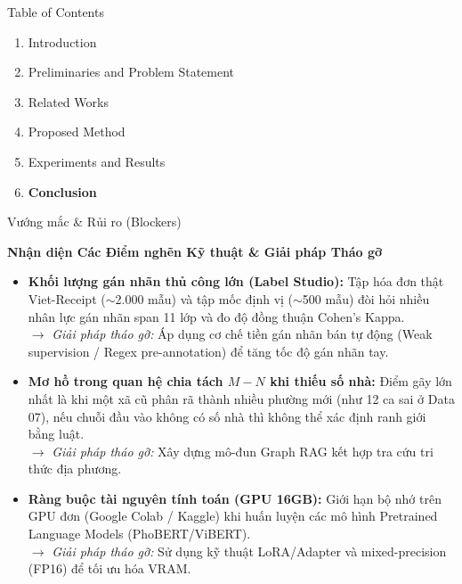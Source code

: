 \documentclass[aspectratio=169,9pt]{beamer}
\begin{document}
\begin{frame}{Table of Contents}
  \vspace{0.4cm}
  \begin{enumerate}[\bfseries 1]
    \setlength{\itemsep}{0.35cm}
    \item \color{gray} Introduction
    \item \color{gray} Preliminaries and Problem Statement
    \item \color{gray} Related Works
    \item \color{gray} Proposed Method
    \item \color{gray} Experiments and Results
    \item \textbf{\color{bkblue} Conclusion}
  \end{enumerate}
\end{frame}

\begin{frame}{Vướng mắc \& Rủi ro (Blockers)}
  \vspace{-0.1cm}
  \centerline{\large\textbf{Nhận diện Các Điểm nghẽn Kỹ thuật \& Giải pháp Tháo gỡ}}
  \vspace{0.08cm}

  {\small
  \begin{itemize}
    \setlength{\itemsep}{1.8pt}
    \item \textbf{Khối lượng gán nhãn thủ công lớn (Label Studio):} Tập hóa đơn thật Viet-Receipt ($\sim$2.000 mẫu) và tập mốc định vị ($\sim$500 mẫu) đòi hỏi nhiều nhân lực gán nhãn span 11 lớp và đo độ đồng thuận Cohen's Kappa.\\
      $\to$ \textit{Giải pháp tháo gỡ:} Áp dụng cơ chế tiền gán nhãn bán tự động (Weak supervision / Regex pre-annotation) để tăng tốc độ gán nhãn tay.
    \item \textbf{Mơ hồ trong quan hệ chia tách $M - N$ khi thiếu số nhà:} Điểm gãy lớn nhất là khi một xã cũ phân rã thành nhiều phường mới (như 12 ca sai ở Data 07), nếu chuỗi đầu vào không có số nhà thì không thể xác định ranh giới bằng luật.\\
      $\to$ \textit{Giải pháp tháo gỡ:} Xây dựng mô-đun Graph RAG kết hợp tra cứu tri thức địa phương.
    \item \textbf{Ràng buộc tài nguyên tính toán (GPU 16GB):} Giới hạn bộ nhớ trên GPU đơn (Google Colab / Kaggle) khi huấn luyện các mô hình Pretrained Language Models (PhoBERT/ViBERT).\\
      $\to$ \textit{Giải pháp tháo gỡ:} Sử dụng kỹ thuật LoRA/Adapter và mixed-precision (FP16) để tối ưu hóa VRAM.
  \end{itemize}
  }
\end{frame}
\end{document}
